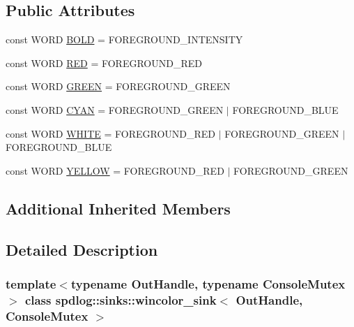 \subsection*{Public Attributes}
\begin{DoxyCompactItemize}
\item 
const W\+O\+RD \hyperlink{classspdlog_1_1sinks_1_1wincolor__sink_a77ef730edcfe9f6f000bed8c846aa6bf}{B\+O\+LD} = F\+O\+R\+E\+G\+R\+O\+U\+N\+D\+\_\+\+I\+N\+T\+E\+N\+S\+I\+TY
\item 
const W\+O\+RD \hyperlink{classspdlog_1_1sinks_1_1wincolor__sink_a8635f904f1dad9e60aaefe307e076f1d}{R\+ED} = F\+O\+R\+E\+G\+R\+O\+U\+N\+D\+\_\+\+R\+ED
\item 
const W\+O\+RD \hyperlink{classspdlog_1_1sinks_1_1wincolor__sink_a39daa889c7395936e2caf95baf2c4181}{G\+R\+E\+EN} = F\+O\+R\+E\+G\+R\+O\+U\+N\+D\+\_\+\+G\+R\+E\+EN
\item 
const W\+O\+RD \hyperlink{classspdlog_1_1sinks_1_1wincolor__sink_a6cbc30363fd20b20c1cd0f22211f0612}{C\+Y\+AN} = F\+O\+R\+E\+G\+R\+O\+U\+N\+D\+\_\+\+G\+R\+E\+EN $\vert$ F\+O\+R\+E\+G\+R\+O\+U\+N\+D\+\_\+\+B\+L\+UE
\item 
const W\+O\+RD \hyperlink{classspdlog_1_1sinks_1_1wincolor__sink_a32682f38336031a282e1681622f1cff4}{W\+H\+I\+TE} = F\+O\+R\+E\+G\+R\+O\+U\+N\+D\+\_\+\+R\+ED $\vert$ F\+O\+R\+E\+G\+R\+O\+U\+N\+D\+\_\+\+G\+R\+E\+EN $\vert$ F\+O\+R\+E\+G\+R\+O\+U\+N\+D\+\_\+\+B\+L\+UE
\item 
const W\+O\+RD \hyperlink{classspdlog_1_1sinks_1_1wincolor__sink_aa148f87d2c8b234c306009268ac7b812}{Y\+E\+L\+L\+OW} = F\+O\+R\+E\+G\+R\+O\+U\+N\+D\+\_\+\+R\+ED $\vert$ F\+O\+R\+E\+G\+R\+O\+U\+N\+D\+\_\+\+G\+R\+E\+EN
\end{DoxyCompactItemize}
\subsection*{Additional Inherited Members}


\subsection{Detailed Description}
\subsubsection*{template$<$typename Out\+Handle, typename Console\+Mutex$>$\newline
class spdlog\+::sinks\+::wincolor\+\_\+sink$<$ Out\+Handle, Console\+Mutex $>$}



